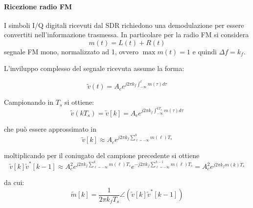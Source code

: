 \paragraph*{Ricezione radio FM}
I simboli I/Q digitali ricevuti dal SDR richiedono una demodulazione per essere convertiti nell'informazione trasmessa. In particolare per la radio FM si considera
\[
    m(t) = L(t) + R(t)
\]
segnale FM mono, normalizzato ad 1, ovvero $\max{m(t)} = 1$ e quindi $\Delta f = k_f$.


L'inviluppo complesso del segnale ricevuta assume la forma:

\[
    \tilde{v}(t) = A_c e^{j2\pi k_f \int_{-\infty}^{t} m(\tau) d\tau}
\]

Campionando in $T_s$ si ottiene:
\[
    \tilde{v}(kT_s) = \tilde{v}[k] = A_c e^{j2\pi k_f \int_{-\infty}^{kT_s} m(\tau) d\tau}
\]

che può essere approssimato in
\[
    \tilde{v}[k] \approx A_c e^{j2\pi k_f \sum_{\ell = -\infty}^{k} m(\ell) T_s}
\]

moltiplicando per il coniugato del campione precedente si ottiene
\[
  \tilde{v}[k] \tilde{v}^*[k-1] \approx A_c^2 e^{j2\pi k_f \sum_{\ell = -\infty}^{k} m(\ell) T_s} e^{-j2\pi k_f \sum_{\ell = -\infty}^{k-1} m(\ell) T_s} = A_c^2 e^{j2\pi k_f m(k) T_s}
\]


da cui:
\[
    \tilde{m}[k] = \frac{1}{2\pi k_f T_s} \angle \left( \tilde{v}[k] \tilde{v}^*[k-1] \right)
\]

